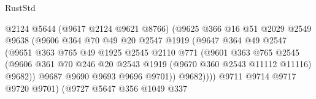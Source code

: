 \begin{lexlean}{RustStd}
\begin{coremodule}
                                  @2124
                                  @5644
                                  (@9617 @2124 @9621 @8766)
                                  (@9625
                                    @366
                                    @16
                                    @51
                                    @2029
                                    @2549
                                    @9638
                                    (@9606
                                      @364
                                      @70
                                      @49
                                      @20
                                      @2547
                                      @1919
                                      (@9647
                                        @364
                                        @49
                                        @2547
                                        (@9651
                                          @363
                                          @765
                                          @49
                                          @1925
                                          @2545
                                          @2110
                                          @771
                                          (@9601
                                            @363
                                            @765
                                            @2545
                                            (@9606
                                              @361
                                              @70
                                              @246
                                              @20
                                              @2543
                                              @1919
                                              (@9670 @360 @2543 @11112 @11116)
                                              @9682))
                                          @9687
                                          @9690
                                          @9693
                                          @9696
                                          @9701))
                                      @9682))))
                              @9711
                              @9714
                              @9717
                              @9720
                              @9701)
                            (@9727
                              @5647
                              @356
                              @1049
                              @337

\end{coremodule}
\end{lexlean}
